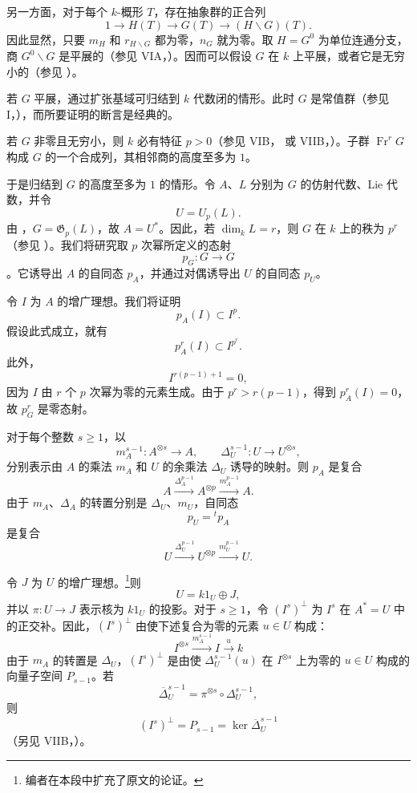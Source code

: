 另一方面，对于每个 \(k\)-概形 \(T\)，存在抽象群的正合列
\[
  1\longrightarrow H(T)\longrightarrow G(T)
  \longrightarrow(H\backslash G)(T).
\]
因此显然，只要 \(m_H\) 和 \(r_{H\backslash G}\) 都为零，\(n_G\) 就为零。取 \(H=G^0\) 为单位连通分支，商 \(G^0\backslash G\) 是平展的（参见 VIA，）。因而可以假设 \(G\) 在 \(k\) 上平展，或者它是无穷小的（参见 ）。

若 \(G\) 平展，通过扩张基域可归结到 \(k\) 代数闭的情形。此时 \(G\) 是常值群（参见 I，），而所要证明的断言是经典的。

若 \(G\) 非零且无穷小，则 \(k\) 必有特征 \(p>0\)（参见 VIB， 或 VIIB，）。子群 \(\operatorname{Fr}^rG\) 构成 \(G\) 的一个合成列，其相邻商的高度至多为 \(1\)。

于是归结到 \(G\) 的高度至多为 \(1\) 的情形。令 \(A\)、\(L\) 分别为 \(G\) 的仿射代数、Lie 代数，并令
\[
  U=U_p(L).
\]
由 ，\(G=\mathfrak G_p(L)\)，故 \(A=U^*\)。因此，若 \(\dim_kL=r\)，则 \(G\) 在 \(k\) 上的秩为 \(p^r\)（参见 ）。我们将研究取 \(p\) 次幂所定义的态射
\[
  p_G:G\longrightarrow G
\]
。它诱导出 \(A\) 的自同态 \(p_A\)，并通过对偶诱导出 \(U\) 的自同态 \(p_U\)。

令 \(I\) 为 \(A\) 的增广理想。我们将证明
\[
  \tag{*}\label{sga3:vii:corollary:8-5-1:equation:star}
  p_A(I)\subset I^p.
\]
假设此式成立，就有
\[
  p_A^r(I)\subset I^{p^r}.
\]
此外，
\[
  I^{r(p-1)+1}=0,
\]
因为 \(I\) 由 \(r\) 个 \(p\) 次幂为零的元素生成。由于 \(p^r>r(p-1)\)，得到 \(p_A^r(I)=0\)，故 \(p_G^r\) 是零态射。

对于每个整数 \(s\ge1\)，以
\[
  m_A^{s-1}:A^{\otimes s}\longrightarrow A,
  \qquad
  \Delta_U^{s-1}:U\longrightarrow U^{\otimes s},
\]
分别表示由 \(A\) 的乘法 \(m_A\) 和 \(U\) 的余乘法 \(\Delta_U\) 诱导的映射。则 \(p_A\) 是复合
\[
  A\xrightarrow{\Delta_A^{p-1}}
  A^{\otimes p}
  \xrightarrow{m_A^{p-1}}A.
\]
由于 \(m_A\)、\(\Delta_A\) 的转置分别是 \(\Delta_U\)、\(m_U\)，自同态
\[
  p_U={}^tp_A
\]
是复合
\[
  U\xrightarrow{\Delta_U^{p-1}}
  U^{\otimes p}
  \xrightarrow{m_U^{p-1}}U.
\]

令 \(J\) 为 \(U\) 的增广理想。\footnote{编者在本段中扩充了原文的论证。}则
\[
  U=k1_U\oplus J,
\]
并以 \(\pi:U\to J\) 表示核为 \(k1_U\) 的投影。对于 \(s\ge1\)，令 \((I^s)^\perp\) 为 \(I^s\) 在 \(A^*=U\) 中的正交补。因此，\((I^s)^\perp\) 由使下述复合为零的元素 \(u\in U\) 构成：
\[
  I^{\otimes s}
  \xrightarrow{m_A^{s-1}}I
  \xrightarrow{u}k
\]
由于 \(m_A\) 的转置是 \(\Delta_U\)，\((I^s)^\perp\) 是由使 \(\Delta_U^{s-1}(u)\) 在 \(I^{\otimes s}\) 上为零的 \(u\in U\) 构成的向量子空间 \(P_{s-1}\)。若
\[
  \overline\Delta_U^{s-1}
  =
  \pi^{\otimes s}\circ\Delta_U^{s-1},
\]
则
\[
  (I^s)^\perp
  =
  P_{s-1}
  =
  \ker\overline\Delta_U^{s-1}
\]
（另见 VIIB，）。

